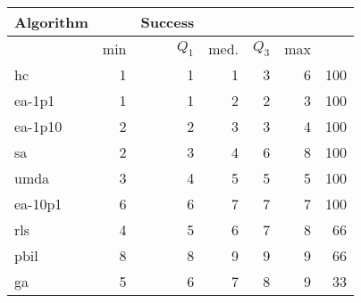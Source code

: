 \begin{tabular}{@{} l *{5}{>{{}}n{1}{0}} >{{ \npunit{\%}}}n{3}{1} @{}}
\toprule
{Algorithm} &  & {Success} \\
\midrule
& {min} & {$Q_1$} & {med.} & {$Q_3$} & {max} & \\
\midrule
hc & 1 & 1 & 1 & 3 & 6 & 100\\
ea-1p1 & 1 & 1 & 2 & 2 & 3 & 100\\
ea-1p10 & 2 & 2 & 3 & 3 & 4 & 100\\
sa & 2 & 3 & 4 & 6 & 8 & 100\\
umda & 3 & 4 & 5 & 5 & 5 & 100\\
ea-10p1 & 6 & 6 & 7 & 7 & 7 & 100\\
rls & 4 & 5 & 6 & 7 & 8 & 66\\
pbil & 8 & 8 & 9 & 9 & 9 & 66\\
ga & 5 & 6 & 7 & 8 & 9 & 33\\
\bottomrule
\end{tabular}
